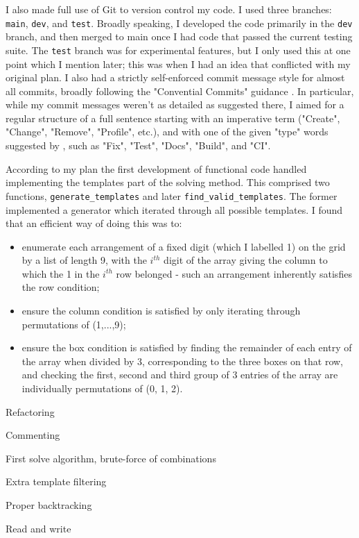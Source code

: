 \documentclass[12pt]{article}
\begin{document}
I also made full use of Git to version control my code.
I used three branches: \texttt{main}, \texttt{dev}, and \texttt{test}.
Broadly speaking, I developed the code primarily in the \texttt{dev} branch, and then merged to main once I had code that passed the current testing suite.
The \texttt{test} branch was for experimental features, but I only used this at one point which I mention later; this was when I had an idea that conflicted with my original plan.
I also had a strictly self-enforced commit message style for almost all commits, broadly following the "Convential Commits" guidance \cite{ccommits}.
In particular, while my commit messages weren't as detailed as suggested there, I aimed for a regular structure of a full sentence starting with an imperative term ("Create", "Change", "Remove", "Profile", etc.), and with one of the given "type" words suggested by \cite{ccommits}, such as "Fix", "Test", "Docs", "Build", and "CI".

According to my plan the first development of functional code handled implementing the templates part of the solving method.
This comprised two functions, \texttt{generate\_templates} and later \texttt{find\_valid\_templates}.
The former implemented a generator which iterated through all possible templates. I found that an efficient way of doing this was to:
\begin{itemize}
    \item enumerate each arrangement of a fixed digit (which I labelled 1) on the grid by a list of length 9, with the $i^{th}$ digit of the array giving the column to which the 1 in the $i^{th}$ row belonged - such an arrangement inherently satisfies the row condition;
    \item ensure the column condition is satisfied by only iterating through permutations of (1,...,9);
    \item ensure the box condition is satisfied by finding the remainder of each entry of the array when divided by 3, corresponding to the three boxes on that row, and checking the first, second and third group of 3 entries of the array are individually permutations of (0, 1, 2).
\end{itemize}

Refactoring

Commenting

First solve algorithm, brute-force of combinations

Extra template filtering

Proper backtracking

Read and write
\end{document}
